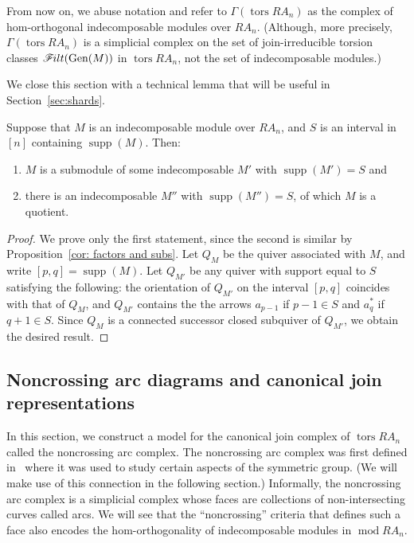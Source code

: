 \documentclass[ALCO,ThmDefs,Unicode,epreuves]{cedram}
\DeclareMathOperator{\tors}{tors}
\DeclareMathOperator{\supp}{supp}
\DeclareMathOperator{\module}{mod}
\newcommand{\filt}{\mathscr{F}\Mk ilt}
\newcommand{\tran}{\operatorname{tran}}
\newcommand{\Gen}{\operatorname{Gen}}
\renewcommand{\1}{\hat{1}}
\newcommand{\0}{\hat{0}}
\newcommand{\newword}[1]{\emph{#1}}
\newcommand*{\Mk}{\mkern -2mu}
\begin{document}
From now on, we abuse notation and refer to $\Gamma(\tors RA_n)$ as the complex of hom-orthogonal indecomposable modules over $RA_n$.
(Although, more precisely, $\Gamma(\tors RA_n)$ is a simplicial complex on the set of join-irreducible torsion classes $\filt(\Gen(M))$ in $\tors RA_n$, not the set of indecomposable modules.)

We close this section with a technical lemma that will be useful in Section~\ref{sec:shards}.
\begin{lemma}\label{lem: ext}
Suppose that $M$ is an indecomposable module over $RA_n$, and
$S$ is an interval in $[n]$ containing $\supp(M)$. Then:
\begin{enumerate}
\item $M$ is a submodule of some indecomposable $M'$ with
 $\supp(M')=S$ and
\item there is an indecomposable $M''$ with $\supp(M'')=S$, of which
 $M$ is a quotient.
\end{enumerate}
\end{lemma}
\begin{proof}
We prove only the first statement, since the second is similar by
Proposition~\ref{cor: factors and subs}. Let $Q_M$ be the quiver
associated with $M$, and write $[p,q]=\supp(M)$. Let $Q_{M'}$ be any
quiver with support equal to $S$ satisfying the following:
the orientation of $Q_{M'}$ on the interval $[p,q]$ coincides with that of $Q_M$, and
$Q_{M'}$ contains the the arrows $a_{p-1}$ if $p-1\in S$ and $a_{q}^*$ if $q+1\in S$.
Since $Q_M$ is a connected successor closed subquiver of $Q_{M'}$, we
obtain the desired result.
\end{proof}




\subsection{Noncrossing arc diagrams and canonical join representations}
\label{sec:arc-diagrams}
In this section, we construct a model for the canonical join complex of $\tors RA_n$ called the noncrossing arc complex.
The noncrossing arc complex was first defined in~\cite{arcs} where it was used to study certain aspects of the symmetric group.
(We will make use of this connection in the following section.)
Informally, the noncrossing arc complex is a simplicial complex whose faces are collections of non-intersecting curves called arcs.
We will see that the ``noncrossing'' criteria that defines such a face also encodes the hom-orthogonality of indecomposable modules in $\module RA_n$.
\end{document}
